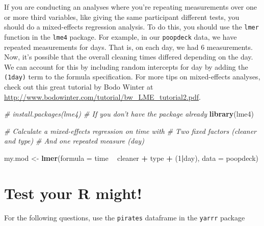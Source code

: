 \documentclass[]{book}
\newenvironment{Shaded}{\begin{snugshade}}{\end{snugshade}}
\newcommand{\KeywordTok}[1]{\textcolor[rgb]{0.13,0.29,0.53}{\textbf{#1}}}
\newcommand{\DataTypeTok}[1]{\textcolor[rgb]{0.13,0.29,0.53}{#1}}
\newcommand{\DecValTok}[1]{\textcolor[rgb]{0.00,0.00,0.81}{#1}}
\newcommand{\StringTok}[1]{\textcolor[rgb]{0.31,0.60,0.02}{#1}}
\newcommand{\CommentTok}[1]{\textcolor[rgb]{0.56,0.35,0.01}{\textit{#1}}}
\newcommand{\OperatorTok}[1]{\textcolor[rgb]{0.81,0.36,0.00}{\textbf{#1}}}
\newcommand{\NormalTok}[1]{#1}
\theoremstyle{definition}
\theoremstyle{definition}
\theoremstyle{remark}
\begin{document}
If you are conducting an analyses where you're repeating measurements
over one or more third variables, like giving the same participant
different tests, you should do a mixed-effects regression analysis. To
do this, you should use the \texttt{lmer} function in the \texttt{lme4}
package. For example, in our \texttt{poopdeck} data, we have repeated
measurements for days. That is, on each day, we had 6 measurements. Now,
it's possible that the overall cleaning times differed depending on the
day. We can account for this by including random intercepts for day by
adding the \texttt{(1\textbar{}day)} term to the formula specification.
For more tips on mixed-effects analyses, check out this great tutorial
by Bodo Winter at
\url{http://www.bodowinter.com/tutorial/bw_LME_tutorial2.pdf}.

\begin{Shaded}
\begin{Highlighting}[]
\CommentTok{# install.packages(lme4)  # If you don't have the package already}
\KeywordTok{library}\NormalTok{(lme4)}

\CommentTok{# Calculate a mixed-effects regression on time with}
\CommentTok{#  Two fixed factors (cleaner and type)}
\CommentTok{#  And one repeated measure (day)}

\NormalTok{my.mod <-}\StringTok{ }\KeywordTok{lmer}\NormalTok{(}\DataTypeTok{formula =}\NormalTok{ time }\OperatorTok{~}\StringTok{ }\NormalTok{cleaner }\OperatorTok{+}\StringTok{ }\NormalTok{type }\OperatorTok{+}\StringTok{ }\NormalTok{(}\DecValTok{1}\OperatorTok{|}\NormalTok{day),}
                \DataTypeTok{data =}\NormalTok{ poopdeck)}
\end{Highlighting}
\end{Shaded}

\section{Test your R might!}\label{test-your-r-might-5}

For the following questions, use the \texttt{pirates} dataframe in the
\texttt{yarrr} package
\end{document}
